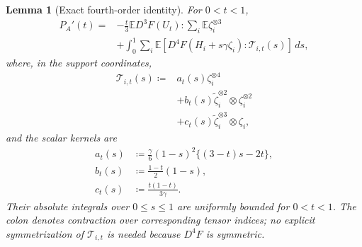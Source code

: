 \documentclass[11pt,letterpaper]{article}
\newtheorem{lemma}{Lemma}
\theoremstyle{remark}
\newcommand{\E}{\mathbb E}
\newcommand{\dd}{\,d}
\begin{document}
\begin{lemma}[Exact fourth-order identity]\label{appx-an:lem:identity}
For \(0<t<1\),
\begin{equation}
 \begin{aligned}
 P_A'(t)
 ={}&-\frac t3\E D^3F(U_t):\sum_i\E\zeta_i^{\otimes3}\\
 &+\int_0^1\sum_i\E\left[
 D^4F(H_i+s\gamma\zeta_i):\mathcal T_{i,t}(s)
 \right]\dd s,
 \end{aligned}
 \label{appx-an:fourth-identity}
\end{equation}
where, in the support coordinates,
\[
 \begin{aligned}
 \mathcal T_{i,t}(s)\coloneqq{}&a_t(s)\zeta_i^{\otimes4}\\
 &+b_t(s)\widetilde\zeta_i^{\otimes2}\otimes\zeta_i^{\otimes2}\\
 &+c_t(s)\widetilde\zeta_i^{\otimes3}\otimes\zeta_i,
 \end{aligned}
\]
and the scalar kernels are
\begin{equation}
 \begin{aligned}
 a_t(s)&\coloneqq\frac\gamma6(1-s)^2\{(3-t)s-2t\},\\
 b_t(s)&\coloneqq\frac{1-t}{2}(1-s),\\
 c_t(s)&\coloneqq\frac{t(1-t)}{3\gamma}.
 \end{aligned}
 \label{appx-an:kernel}
\end{equation}
Their absolute integrals over \(0\le s\le1\) are uniformly bounded
for \(0<t<1\). The colon denotes contraction over corresponding
tensor indices; no explicit symmetrization of \(\mathcal T_{i,t}\)
is needed because \(D^4F\) is symmetric.
\end{lemma}
\end{document}
